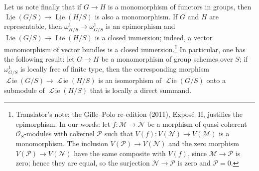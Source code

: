 %
Let us note finally that if \(G\to H\) is a monomorphism of functors in
groups, then \(\underline{\operatorname{Lie}}(G/S)\to
\underline{\operatorname{Lie}}(H/S)\) is also a monomorphism. If \(G\) and
\(H\) are representable, then \(\omega^1_{H/S}\to\omega^1_{G/S}\) is an
epimorphism and \(\operatorname{Lie}(G/S)\to\operatorname{Lie}(H/S)\) is a
closed immersion; indeed, a vector monomorphism of vector bundles is a
closed immersion.\footnote{Translator's note: the Gille--Polo re-edition
(2011), Expos\'e~II, justifies the epimorphism. In our words: let
\(f\colon\mathcal M\to\mathcal N\) be a morphism of quasi-coherent
\(\mathcal O_S\)-modules with cokernel \(\mathcal P\) such that
\(V(f)\colon V(\mathcal N)\to V(\mathcal M)\) is a monomorphism. The
inclusion \(V(\mathcal P)\to V(\mathcal N)\) and the zero morphism
\(V(\mathcal P)\to V(\mathcal N)\) have the same composite with \(V(f)\),
since \(\mathcal M\to\mathcal P\) is zero; hence they are equal, so the
surjection \(\mathcal N\to\mathcal P\) is zero and \(\mathcal P=0\).} In particular, one has the following result: let
\(G\to H\) be a monomorphism of group schemes over \(S\); if
\(\omega^1_{G/S}\) is locally free of finite type, then the corresponding
morphism \(\mathop{\mathscr L\!ie}(G/S)\to\mathop{\mathscr L\!ie}(H/S)\) is
an isomorphism of \(\mathop{\mathscr L\!ie}(G/S)\) onto a submodule of
\(\mathop{\mathscr L\!ie}(H/S)\) that is locally a direct summand.


